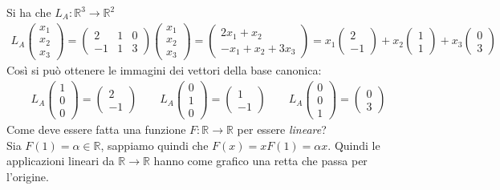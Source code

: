 \documentclass{article}
\begin{document}
Si ha che $L_A : \mathbb{R}^3 \to \mathbb{R}^2$
\begin{align*}
  L_A\begin{pmatrix}
    x_1 \\
    x_2 \\
    x_3
  \end{pmatrix}
  =
  \begin{pmatrix}
    2 & 1 & 0\\
    -1 & 1 & 3
  \end{pmatrix}
  \begin{pmatrix}
    x_1 \\
    x_2 \\
    x_3
  \end{pmatrix}
  =
  \begin{pmatrix}
    2x_1+x_2 \\
    -x_1+x_2+3x_3
  \end{pmatrix}
  = 
  x_1\begin{pmatrix}
    2 \\
    -1
  \end{pmatrix}
  +x_2\begin{pmatrix}
    1 \\
    1
  \end{pmatrix}
  +x_3\begin{pmatrix}
    0 \\
    3
  \end{pmatrix}
\end{align*}
Così si può ottenere le immagini dei vettori della base canonica:
\begin{align*}
  L_A\begin{pmatrix}
    1 \\ 0 \\ 0
  \end{pmatrix}
  =
  \begin{pmatrix}
    2 \\ -1
  \end{pmatrix}
  \qquad
  L_A\begin{pmatrix}
  0 \\ 1 \\ 0
  \end{pmatrix}
  =
  \begin{pmatrix}
    1 \\ -1
  \end{pmatrix}
  \qquad
  L_A\begin{pmatrix}
    0 \\ 0 \\ 1
    \end{pmatrix}
    =
    \begin{pmatrix}
      0 \\ 3
    \end{pmatrix}
\end{align*}
Come deve essere fatta una funzione $F : \mathbb{R} \to \mathbb{R}$ per essere \textit{lineare}?
\\Sia $F(1)=\alpha \in \mathbb{R}$, sappiamo quindi che $F(x)=xF(1)=\alpha x$. Quindi le applicazioni lineari da $\mathbb{R}\to\mathbb{R}$ hanno come grafico una retta che passa per l'origine.
\end{document}
